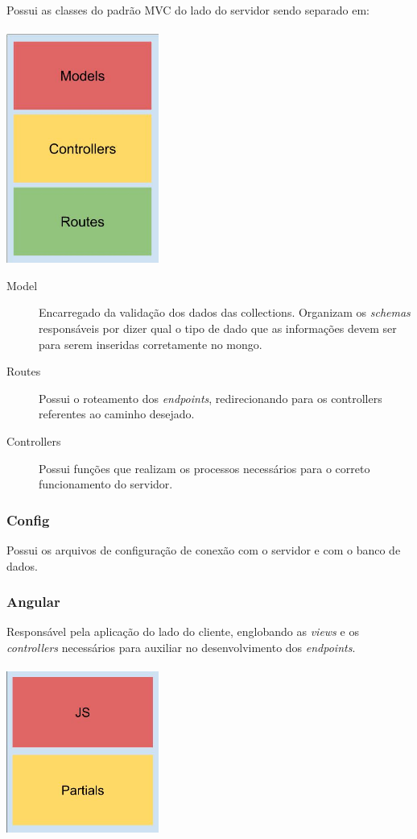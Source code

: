 \documentclass[
	12pt,				%
	oneside,			%
	a4paper,			%
	brazil				%
]{abntex2}
\begin{document}
Possui as classes do padrão MVC do lado do servidor sendo separado em:
\\
\\
\includegraphics[width=5cm, center]{images/brick_diagram_node_app}

\begin{description}

\item[Model] Encarregado da validação dos dados das collections. Organizam os \textit{schemas} responsáveis por dizer qual o tipo de dado que as informações devem ser para serem inseridas corretamente no mongo.

\item[Routes] Possui o roteamento dos \textit{endpoints}, redirecionando para os controllers referentes ao caminho desejado.

\item[Controllers] Possui funções que realizam os processos necessários para o correto funcionamento do servidor.

\end{description}

\subsubsection{Config}

Possui os arquivos de configuração de conexão com o servidor e com o banco de dados.

\subsubsection{Angular}

Responsável pela aplicação do lado do cliente, englobando as \textit{views} e os \textit{controllers} necessários para auxiliar no desenvolvimento dos \textit{endpoints}.
\\
\\
\includegraphics[width=5cm, center]{images/brick_diagram_angular}
\end{document}
